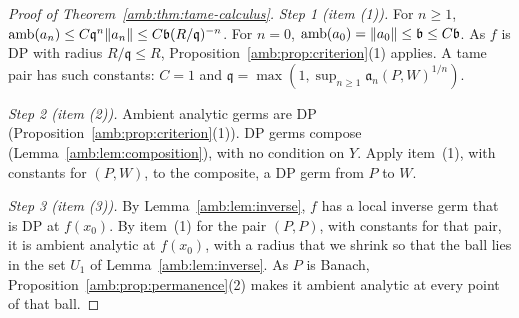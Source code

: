 \begin{proof}[Proof of Theorem~\ref{amb:thm:tame-calculus}]
\emph{Step 1 (item (1)).} For $n\ge1$, $\operatorname{amb}(a_n)\le C\mathfrak q^n\lVert a_n\rVert\le C\mathfrak b(R/\mathfrak q)^{-n}$. For $n=0$,
$\operatorname{amb}(a_0)=\lVert a_0\rVert\le \mathfrak b\le C\mathfrak b$. As $f$ is DP with radius $R/\mathfrak q\le R$,
Proposition~\ref{amb:prop:criterion}(1) applies. A tame pair has such constants: $C=1$ and $\mathfrak q=\max(1,\sup_{n\ge1}\mathfrak a_n(P,W)^{1/n})$.

\emph{Step 2 (item (2)).} Ambient analytic germs are DP (Proposition~\ref{amb:prop:criterion}(1)). DP germs compose
(Lemma~\ref{amb:lem:composition}), with no condition on $Y$. Apply item~(1), with constants for $(P,W)$, to the composite, a DP germ from $P$ to $W$.

\emph{Step 3 (item (3)).} By Lemma~\ref{amb:lem:inverse}, $f$ has a local inverse germ that is DP at $f(x_0)$. By item~(1) for the
pair $(P,P)$, with constants for that pair, it is ambient analytic at $f(x_0)$, with a radius that we shrink so that the ball lies in the set $U_1$ of
Lemma~\ref{amb:lem:inverse}. As $P$ is Banach, Proposition~\ref{amb:prop:permanence}(2) makes it ambient analytic at every point of
that ball.
\end{proof}

